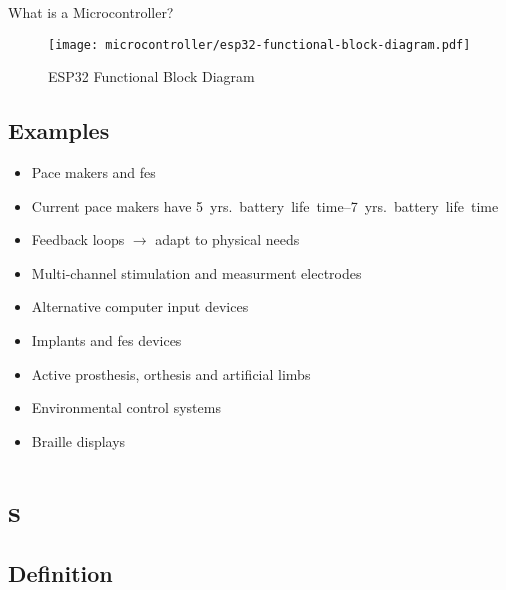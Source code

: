 \documentclass[aspectratio=169]{beamer}
\begin{document}
\begin{frame}{What is a Microcontroller?}
    \begin{figure}
        \texttt{[image: microcontroller/esp32-functional-block-diagram.pdf]}
        \caption{ESP32 Functional Block Diagram}
    \end{figure}
\end{frame}

\subsection{Examples}
\begin{frame}
    \begin{itemize}
        \item Pace makers and \ac{fes}
        \item Current pace makers have \SIrange{5}{7}{yrs.} battery life time
        \item Feedback loops $\rightarrow$ adapt to physical needs
        \item Multi-channel stimulation and measurment electrodes
    \end{itemize}
\end{frame}

\begin{frame}
\end{frame}

\begin{frame}
    \begin{itemize}
        \item Alternative computer input devices
        \item Implants and \acs{fes} devices
        \item Active prosthesis, orthesis and artificial limbs
        \item Environmental control systems
        \item Braille displays
    \end{itemize}
\end{frame}

\section{s}

\subsection{Definition}
\end{document}
